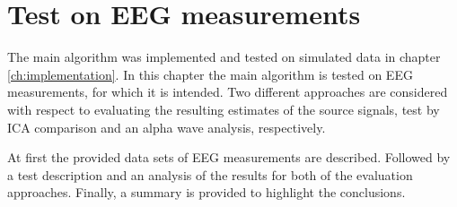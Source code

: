 \chapter{Test on EEG measurements}\label{ch:eeg_test}
The main algorithm was implemented and tested on simulated data in chapter \ref{ch:implementation}. 
In this chapter the main algorithm is tested on EEG measurements, for which it is intended. 
Two different approaches are considered with respect to evaluating the resulting estimates of the source signals, test by ICA comparison and an alpha wave analysis, respectively.

At first the provided data sets of EEG measurements are described. 
Followed by a test description and an analysis of the results for both of the evaluation approaches. 
Finally, a summary is provided to highlight the conclusions.  

